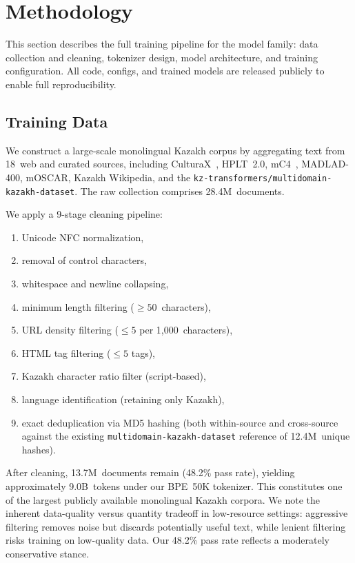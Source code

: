\section{Methodology}
\label{sec:methodology}

This section describes the full training pipeline for the \sozkz{} model family:
data collection and cleaning, tokenizer design, model architecture, and training
configuration. All code, configs, and trained models are released publicly to
enable full reproducibility.

\subsection{Training Data}
\label{sec:data}

We construct a large-scale monolingual Kazakh corpus by aggregating text from
18~web and curated sources, including CulturaX~\citep{conneau2020xlmr},
HPLT~2.0, mC4~\citep{devlin2019bert}, MADLAD-400, mOSCAR, Kazakh Wikipedia,
and the \texttt{kz-transformers/multidomain-kazakh-dataset}.
The raw collection comprises 28.4M~documents.

We apply a 9-stage cleaning pipeline:
\begin{enumerate}
  \item Unicode NFC normalization,
  \item removal of control characters,
  \item whitespace and newline collapsing,
  \item minimum length filtering ($\geq50$~characters),
  \item URL density filtering ($\leq5$ per 1{,}000~characters),
  \item HTML tag filtering ($\leq5$ tags),
  \item Kazakh character ratio filter (script-based),
  \item language identification (retaining only Kazakh),
  \item exact deduplication via MD5 hashing (both within-source and
        cross-source against the existing \texttt{multidomain-kazakh-dataset}
        reference of 12.4M~unique hashes).
\end{enumerate}

After cleaning, 13.7M~documents remain (48.2\% pass rate), yielding
approximately 9.0B~tokens under our BPE~50K tokenizer. This constitutes one of
the largest publicly available monolingual Kazakh corpora. We note the inherent
data-quality versus quantity tradeoff in low-resource settings: aggressive
filtering removes noise but discards potentially useful text, while lenient
filtering risks training on low-quality data. Our 48.2\% pass rate reflects a
moderately conservative stance.

